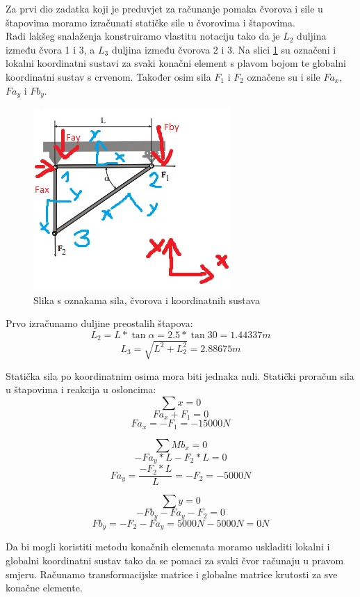 \documentclass[a4paper,twoside,12pt]{memoir} %
\begin{document}
Za prvi dio zadatka koji je preduvjet za računanje pomaka čvorova i sile u štapovima moramo izračunati statičke sile u čvorovima i štapovima. \\
Radi lakšeg snalaženja konstruiramo vlastitu notaciju tako da je $L_2$ duljina između čvora 1 i 3, a $L_3$ duljina između čvorova 2 i 3. Na slici \ref{fig:problem_noted} su označeni i lokalni koordinatni sustavi za svaki konačni element s plavom bojom te globalni koordinatni sustav s crvenom. Također osim sila $F_1$ i $F_2$ označene su i sile $Fa_x$, $Fa_y$ i $Fb_y$.

\begin{figure}[h!t]
\begin{center}
\includegraphics[scale=0.9]{pictures/chapter_fem/problem_glavas_notacija.jpg}
\caption{Slika s oznakama sila, čvorova i koordinatnih sustava}
\label{fig:problem_noted}
\end{center}
\end{figure}

Prvo izračunamo duljine preostalih štapova:
$$ L_2 = L * \tan{\alpha} = 2.5 * \tan{30} = 1.44337 m$$
$$ L_3 = \sqrt{L^2 + L^2_2} = 2.88675 m $$

Statička sila po koordinatnim osima mora biti jednaka nuli.
Statički proračun sila u štapovima i reakcija u osloncima:
$$ \sum x = 0 $$
$$ Fa_x + F_1 = 0 $$
$$ Fa_x = -F_1 = -15000 N $$
\newline

$$ \sum Mb_x = 0 $$
$$ -Fa_y * L - F_2 * L = 0 $$
$$ Fa_y = \frac{-F_2 * L}{L} = -F_2 = -5000 N $$
\newline

$$ \sum y = 0 $$
$$ -Fb_y - Fa_y - F_2 = 0 $$
$$ Fb_y = -F_2 - Fa_y = 5000 N - 5000 N = 0 N $$
\newline


Da bi mogli koristiti metodu konačnih elemenata moramo uskladiti lokalni i globalni koordinatni sustav tako da se pomaci za svaki čvor računaju u pravom smjeru. Računamo transformacijske matrice i globalne matrice krutosti za sve konačne elemente. \par
\end{document}
